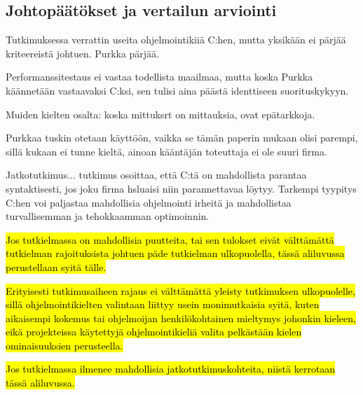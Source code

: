 \subsection{Johtopäätökset ja vertailun arviointi}

Tutkimuksessa verrattin useita ohjelmointikiiä C:hen, mutta yksikään ei
pärjää kriteereistä johtuen. Purkka pärjää.

Performanssitestaus ei vastaa todellista maailmaa, mutta koska Purkka käännetään
vastaavaksi C:ksi, sen tulisi aina päästä identtiseen suorituskykyyn.

Muiden kielten osalta: koska mittuksrt on mittauksia, ovat epätarkkoja.

Purkkaa tuskin otetaan käyttöön, vaikka se tämän paperin mukaan olisi parempi, sillä
kukaan ei tunne kieltä, ainoan kääntäjän toteuttaja ei ole suuri firma.

Jatkotutkimus... tutkimus osoittaa, että C:tä on mahdollista parantaa syntaktisesti,
jos joku firma hsluaisi niin parannettavaa löytyy. Tarkempi tyypitys C:hen voi
paljastaa mahdollisia ohjelmointi irheitä ja mahdollistaa turvallisemman ja tehokkaamman
optimoinnin.

\hl{Jos tutkielmassa on mahdollisia puutteita, tai sen tulokset eivät
välttämättä tutkielman rajoituksista johtuen päde tutkielman ulkopuolella,
tässä aliluvussa perustellaan syitä tälle.}

\hl{Erityisesti tutkimusaiheen rajaus ei välttämättä yleisty tutkimuksen
ulkopuolelle, sillä ohjelmointikielten valintaan liittyy usein monimutkaisia
syitä, kuten aikaisempi kokemus tai ohjelmoijan henkilökohtainen mieltymys
johonkin kieleen, eikä projekteissa käytettyjä ohjelmointikieliä valita
pelkästään kielen ominaisuuksien perusteella.}

\hl{Jos tutkielmassa ilmenee mahdollisia jatkotutkimuskohteita, niistä
kerrotaan tässä aliluvussa.}
